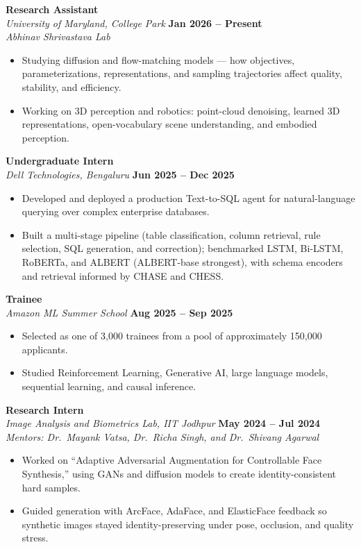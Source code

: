 \documentclass[a4paper,10pt]{article}
\begin{document}
\vspace{0.55em}
\noindent\textbf{Research Assistant} \\
\textit{University of Maryland, College Park} \hfill \textbf{Jan 2026 -- Present} \\
\textit{Abhinav Shrivastava Lab}
\begin{itemize}[label=--]
    \item Studying diffusion and flow-matching models — how objectives, parameterizations, representations, and sampling trajectories affect quality, stability, and efficiency.
    \item Working on 3D perception and robotics: point-cloud denoising, learned 3D representations, open-vocabulary scene understanding, and embodied perception.
\end{itemize}

\vspace{0.55em}
\noindent\textbf{Undergraduate Intern} \\
\textit{Dell Technologies, Bengaluru} \hfill \textbf{Jun 2025 -- Dec 2025}
\begin{itemize}[label=--]
    \item Developed and deployed a production Text-to-SQL agent for natural-language querying over complex enterprise databases.
    \item Built a multi-stage pipeline (table classification, column retrieval, rule selection, SQL generation, and correction); benchmarked LSTM, Bi-LSTM, RoBERTa, and ALBERT (ALBERT-base strongest), with schema encoders and retrieval informed by CHASE and CHESS.
\end{itemize}

\vspace{0.55em}
\noindent\textbf{Trainee} \\
\textit{Amazon ML Summer School} \hfill \textbf{Aug 2025 -- Sep 2025}
\begin{itemize}[label=--]
    \item Selected as one of 3,000 trainees from a pool of approximately 150,000 applicants.
    \item Studied Reinforcement Learning, Generative AI, large language models, sequential learning, and causal inference.
\end{itemize}

\vspace{0.55em}
\noindent\textbf{Research Intern} \\
\textit{Image Analysis and Biometrics Lab, IIT Jodhpur} \hfill \textbf{May 2024 -- Jul 2024} \\
\textit{Mentors: Dr.\ Mayank Vatsa, Dr.\ Richa Singh, and Dr.\ Shivang Agarwal}
\begin{itemize}[label=--]
    \item Worked on ``Adaptive Adversarial Augmentation for Controllable Face Synthesis,'' using GANs and diffusion models to create identity-consistent hard samples.
    \item Guided generation with ArcFace, AdaFace, and ElasticFace feedback so synthetic images stayed identity-preserving under pose, occlusion, and quality stress.
\end{itemize}
\end{document}
